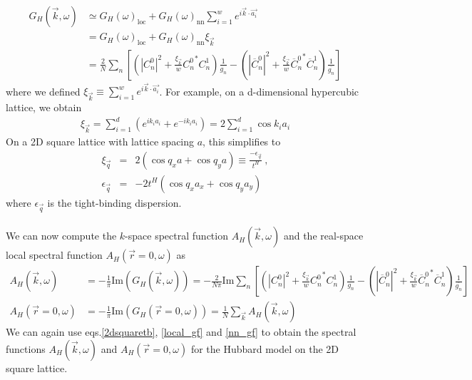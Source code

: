 \documentclass[12pt]{article}
\numberwithin{equation}{section}
\begin{document}
\begin{equation}\begin{aligned}
	\label{k_Gf}
	G_H (\vec k, \omega) &\simeq G_H (\omega)_\text{loc} + G_H (\omega)_\text{nn}\sum_{i=1}^w e^{i \vec{k}\cdot\vec {a_i}}\\
			     &= G_H (\omega)_\text{loc} + G_H (\omega)_\text{nn} \xi_{\vec k}\\
			     &= \frac{2}{N}\sum_n\left[\left(|C^0_{n}|^2 + \frac{\xi_{\vec{k}}}{w}{C^0_{n}}^* C^1_{n} \right)\frac{1}{g_n} - \left(|\overline C^0_{n}|^2 + \frac{\xi_{\vec{k}}}{w}{\overline C^0_{n}}^* \overline C^1_{n}\right)\frac{1}{\overline{g_n}}\right]
\end{aligned}\end{equation}
where we defined \(\xi_{\vec k} \equiv \sum_{i=1}^w e^{i \vec{k}\cdot\vec {a_i}}\). For example, on a d-dimensional hypercubic lattice, we obtain
\begin{equation}\begin{aligned}
	\xi_{\vec k} = \sum_{i=1}^d \left(e^{i k_i {a_i}} + e^{-i k_i {a_i}}\right) = 2\sum_{i=1}^d \cos k_i a_i
\end{aligned}\end{equation}
On a 2D square lattice with lattice spacing $a$, this simplifies to
\begin{eqnarray}
	\label{2dsquaretb}
\xi_{\vec{q}} &=& 2(\cos q_{x}a + \cos q_{y}a)\equiv \frac{-\epsilon_{\vec{q}}}{t^{H}}~,\nonumber\\
\epsilon_{\vec{q}} &=& -2t^{H}(\cos q_{x}a_{x} + \cos q_{y}a_{y})~
\end{eqnarray}
where \(\epsilon_{\vec{q}}\) is the tight-binding dispersion.
\\\\
We can now compute the $k$-space spectral function $A_{H}(\vec{k},\omega)$ and the real-space local spectral function $A_{H}(\vec{r}=0,\omega)$ as
\begin{equation}\begin{aligned}
	A_{H}(\vec{k},\omega) &= -\frac{1}{\pi} \textrm{Im}(G_{H}(\vec{k},\omega)) = -\frac{2}{N\pi} \textrm{Im}\sum_n\left[\left(|C^0_{n}|^2 + \frac{\xi_{\vec{k}}}{w}{C^0_{n}}^* C^1_{n} \right)\frac{1}{g_n} - \left(|\overline C^0_{n}|^2 + \frac{\xi_{\vec{k}}}{w}{\overline C^0_{n}}^* \overline C^1_{n}\right)\frac{1}{\overline{g_n}}\right]\\
A_{H}(\vec{r}=0,\omega) &= -\frac{1}{\pi} \textrm{Im}(G_{H}(\vec{r}=0,\omega)) = \frac{1}{N}\sum_{\vec{k}}A_{H}(\vec{k},\omega)
\end{aligned}\end{equation}
We can again use eqs.\eqref{2dsquaretb}, \eqref{local_gf} and \eqref{nn_gf} to obtain the spectral functions  $A_{H} (\vec{k},\omega)$ and $A_{H} (\vec{r}=0,\omega)$ for the Hubbard model on the 2D square lattice.
\end{document}
